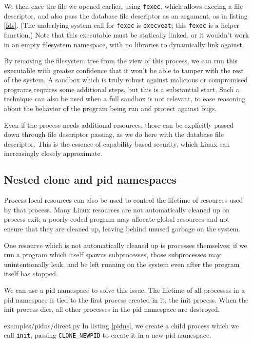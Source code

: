 \documentclass[sigplan]{acmart}
\begin{document}
We then exec the file we opened earlier, using \texttt{fexec},
which allows execing a file descriptor,
and also pass the database file descriptor as an argument,
as in listing \ref{fds}.
(The underlying system call for \texttt{fexec} is \texttt{execveat};
this \texttt{fexec} is a helper function.)
Note that this executable must be statically linked,
or it wouldn't work in an empty filesystem namespace,
with no libraries to dynamically link against.

By removing the filesystem tree from the view of this process,
we can run this executable with greater confidence
that it won't be able to tamper with the rest of the system.
A sandbox which is truly robust against malicious or compromised programs requires some additional steps,
but this is a substantial start.
Such a technique can also be used when a full sandbox is not relevant,
to ease reasoning about the behavior of the program being run
and protect against bugs.

Even if the process needs additional resources,
those can be explicitly passed down through file descriptor passing,
as we do here with the database file descriptor.
This is the essence of capability-based security,
which Linux can increasingly closely approximate.
\subsection{Nested clone and pid namespaces}
Process-local resources can also be used to control the lifetime of resources used by that process.
Many Linux resources are not automatically cleaned up on process exit;
a poorly coded program may allocate global resources
and not ensure that they are cleaned up,
leaving behind unused garbage on the system.

One resource which is not automatically cleaned up is processes themselves;
if we run a program which itself spawns subprocesses,
those subprocesses may unintentionally leak,
and be left running on the system even after the program itself has stopped.

We can use a pid namespace to solve this issue.
The lifetime of all processes in a pid namespace is tied to the first process created in it,
the init process.
When the init process dies,
all other processes in the pid namespace are destroyed.


{examples/pidns/direct.py}
In listing \ref{pidns},
we create a child process which we call \texttt{init},
passing \verb|CLONE_NEWPID| to create it in a new pid namespace.
\end{document}
